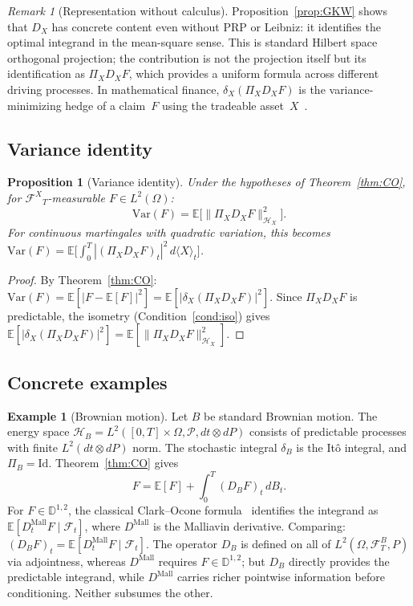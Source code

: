 \documentclass[11pt,a4paper]{article}
\theoremstyle{plain}
\newtheorem{proposition}[theorem]{Proposition}
\theoremstyle{definition}
\newtheorem{example}[theorem]{Example}
\theoremstyle{remark}
\newtheorem{remark}[theorem]{Remark}
\newcommand{\E}{\mathbb{E}}
\newcommand{\Id}{\mathrm{Id}}
\newcommand{\Var}{\mathrm{Var}}
\newcommand{\HX}{\mathcal{H}_X}
\newcommand{\HB}{\mathcal{H}_B}
\newcommand{\FX}{\mathcal{F}^X}
\begin{document}
\begin{remark}[Representation without calculus]\label{rem:GKW_interp}
Proposition~\ref{prop:GKW} shows that $D_X$ has concrete content even without PRP or Leibniz: it identifies the optimal integrand in the mean-square sense. This is standard Hilbert space orthogonal projection; the contribution is not the projection itself but its identification as $\Pi_X D_X F$, which provides a uniform formula across different driving processes. In mathematical finance, $\delta_X(\Pi_X D_X F)$ is the variance-minimizing hedge of a claim~$F$ using the tradeable asset~$X$~\cite{DiNunno2009}.
\end{remark}


\subsection{Variance identity}

\begin{proposition}[Variance identity]\label{prop:var}
Under the hypotheses of Theorem~\ref{thm:CO}, for ${\FX}_T$-measurable $F \in L^2(\Omega)$:
\[
\Var(F) = \E\bigl[\|\Pi_X D_X F\|^2_{\HX}\bigr].
\]
For continuous martingales with quadratic variation, this becomes $\Var(F) = \E\bigl[\int_0^T |(\Pi_X D_X F)_t|^2\,d\langle X\rangle_t\bigr]$.
\end{proposition}

\begin{proof}
By Theorem~\ref{thm:CO}: $\Var(F) = \E[|F - \E[F]|^2] = \E[|\delta_X(\Pi_X D_X F)|^2]$. Since $\Pi_X D_X F$ is predictable, the isometry (Condition~\ref{cond:iso}) gives $\E[|\delta_X(\Pi_X D_X F)|^2] = \E[\|\Pi_X D_X F\|^2_{\HX}]$.
\end{proof}


\subsection{Concrete examples}

\begin{example}[Brownian motion]\label{ex:brownian}
Let $B$ be standard Brownian motion. The energy space $\HB = L^2([0,T] \times \Omega, \mathcal{P}, dt \otimes dP)$ consists of predictable processes with finite $L^2(dt \otimes dP)$ norm. The stochastic integral $\delta_B$ is the It\^o integral, and $\Pi_B = \Id$. Theorem~\ref{thm:CO} gives
\[
F = \E[F] + \int_0^T (D_B F)_t\,dB_t.
\]
For $F \in \mathbb{D}^{1,2}$, the classical Clark--Ocone formula~\cite[Theorem 1.3.14]{Nualart2006} identifies the integrand as $\E[D_t^{\mathrm{Mall}} F \mid \mathcal{F}_t]$, where $D^{\mathrm{Mall}}$ is the Malliavin derivative. Comparing: $(D_B F)_t = \E[D_t^{\mathrm{Mall}} F \mid \mathcal{F}_t]$. The operator $D_B$ is defined on all of $L^2(\Omega, \mathcal{F}_T^B, P)$ via adjointness, whereas $D^{\mathrm{Mall}}$ requires $F \in \mathbb{D}^{1,2}$; but $D_B$ directly provides the predictable integrand, while $D^{\mathrm{Mall}}$ carries richer pointwise information before conditioning. Neither subsumes the other.
\end{example}
\end{document}
